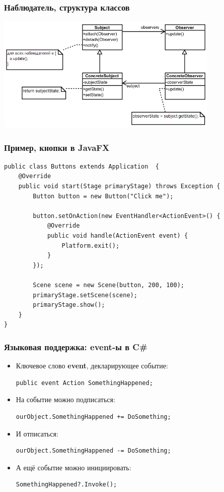\documentclass[xetex,mathserif,serif]{beamer}
\begin{document}
	\begin{frame}
		\frametitle{Наблюдатель, структура классов}
		\begin{center}
			\includegraphics[width=0.8\textwidth]{observer.png}
		\end{center}
	\end{frame}

	\begin{frame}[fragile]
		\frametitle{Пример, кнопки в JavaFX}
		\begin{small}
			\begin{verbatim}
public class Buttons extends Application  {
    @Override
    public void start(Stage primaryStage) throws Exception {
        Button button = new Button("Click me");

        button.setOnAction(new EventHandler<ActionEvent>() {
            @Override
            public void handle(ActionEvent event) {
                Platform.exit();
            }
        });

        Scene scene = new Scene(button, 200, 100);
        primaryStage.setScene(scene);
        primaryStage.show();
    }
}
			\end{verbatim}
		\end{small}
	\end{frame}

	\begin{frame}[fragile]
		\frametitle{Языковая поддержка: event-ы в C\#}
		\begin{itemize}
			\item Ключевое слово \textbf{event}, декларирующее событие:

				\begin{verbatim}
public event Action SomethingHappened;
				\end{verbatim}
			\item На событие можно подписаться:

				\begin{verbatim}
ourObject.SomethingHappened += DoSomething;
				\end{verbatim}
			\item И отписаться:

				\begin{verbatim}
ourObject.SomethingHappened -= DoSomething;
				\end{verbatim}
			\item А ещё событие можно инициировать:

				\begin{verbatim}
SomethingHappened?.Invoke();
				\end{verbatim}
		\end{itemize}
	\end{frame}
\end{document}
